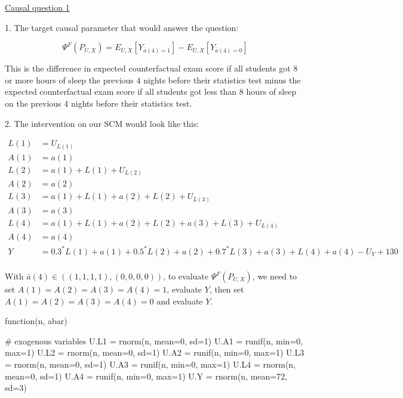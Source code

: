 \documentclass[answers]{exam}
\begin{document}
\begin{solution}

\noindent\underline{Causal question 1}

1. The target causal parameter that would answer the question:

\[
\Psi^F(P_{U,X}) = E_{U,X}[Y_{\bar{a}(4)=1}] - E_{U,X}[Y_{\bar{a}(4)=0}]
\]

This is the difference in expected counterfactual exam score if all students got 8 or more hours of sleep the previous 4 nights before their statistics test minus the expected counterfactual exam score if all students got less than 8 hours of sleep on the previous 4 nights before their statistics test.

2. The intervention on our SCM would look like this:

\begin{align*}
L(1) & = U_{L(1)}\\
A(1) & = a(1) \\
L(2) & = a(1) + L(1) + U_{L(2)} \\
A(2) & = a(2) \\
L(3) & = a(1) + L(1) + a(2) + L(2) + U_{L(3)}\\
A(3) & = a(3) \\
L(4) &= a(1) + L(1) + a(2) + L(2) + a(3) + L(3) + U_{L(4)}\\
A(4) &= a(4) \\
Y & = 0.3^*L(1) + a(1) + 0.5^*L(2) + a(2) + 0.7^*L(3) + a(3) + L(4) + a(4) - U_Y + 130\\
\end{align*}

With $\bar{a}(4) \in ((1,1,1,1), (0, 0, 0, 0))$, to evaluate $\Psi^F(P_{U,X})$, we need to set $A(1) = A(2) = A(3) = A(4) = 1$, evaluate $Y$, then set $A(1) = A(2) = A(3) = A(4) = 0$ and evaluate $Y$.



\begin{Schunk}
\begin{Soutput}
function(n, abar) {
  
  # exogenous variables
  U.L1 = rnorm(n, mean=0, sd=1)
  U.A1 = runif(n, min=0, max=1)
  U.L2 = rnorm(n, mean=0, sd=1)
  U.A2 = runif(n, min=0, max=1)
  U.L3 = rnorm(n, mean=0, sd=1)
  U.A3 = runif(n, min=0, max=1)
  U.L4 = rnorm(n, mean=0, sd=1)
  U.A4 = runif(n, min=0, max=1)
  U.Y = rnorm(n, mean=72, sd=3)
  
}
\end{Soutput}
\end{Schunk}
\end{solution}
\end{document}
